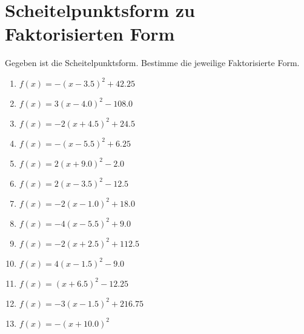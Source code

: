 \documentclass{article}%
\begin{document}
\section{Scheitelpunktsform zu Faktorisierten Form}%
\label{sec:ScheitelpunktsformzuFaktorisiertenForm}%
Gegeben ist die Scheitelpunktsform. Bestimme die jeweilige Faktorisierte Form.%
\begin{enumerate}[label=\alph*)]%
\item%
\newline\vspace{0.5cm} $f(x)=-(x-3.5)^2 +42.25$%
\item%
\newline\vspace{0.5cm} $f(x)=3(x-4.0)^2 -108.0$%
\item%
\newline\vspace{0.5cm} $f(x)=-2(x+4.5)^2 +24.5$%
\item%
\newline\vspace{0.5cm} $f(x)=-(x-5.5)^2 +6.25$%
\item%
\newline\vspace{0.5cm} $f(x)=2(x+9.0)^2 -2.0$%
\item%
\newline\vspace{0.5cm} $f(x)=2(x-3.5)^2 -12.5$%
\item%
\newline\vspace{0.5cm} $f(x)=-2(x-1.0)^2 +18.0$%
\item%
\newline\vspace{0.5cm} $f(x)=-4(x-5.5)^2 +9.0$%
\item%
\newline\vspace{0.5cm} $f(x)=-2(x+2.5)^2 +112.5$%
\item%
\newline\vspace{0.5cm} $f(x)=4(x-1.5)^2 -9.0$%
\item%
\newline\vspace{0.5cm} $f(x)=(x+6.5)^2 -12.25$%
\item%
\newline\vspace{0.5cm} $f(x)=-3(x-1.5)^2 +216.75$%
\item%
\newline\vspace{0.5cm} $f(x)=-(x+10.0)^2$%

\end{enumerate}
\end{document}
